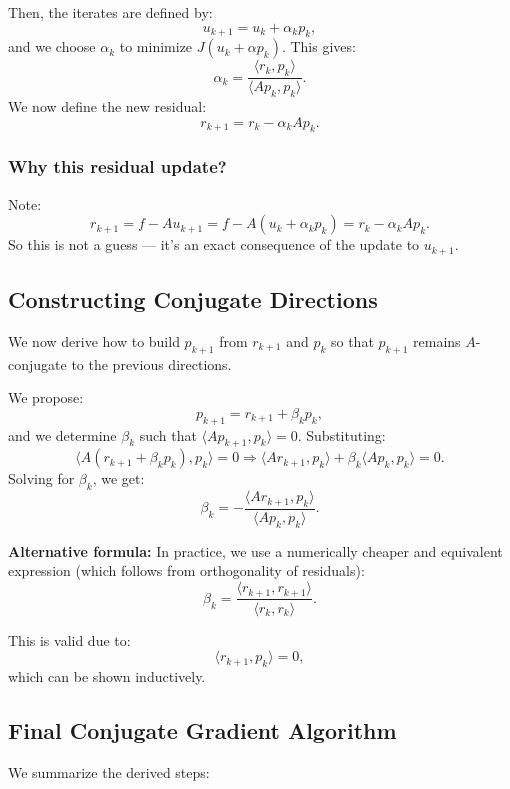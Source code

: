 \documentclass[12pt]{article}
\begin{document}
Then, the iterates are defined by:
\[
u_{k+1} = u_k + \alpha_k p_k,
\]
and we choose \( \alpha_k \) to minimize \( J(u_k + \alpha p_k) \). This gives:
\[
\alpha_k = \frac{\langle r_k, p_k \rangle}{\langle A p_k, p_k \rangle}.
\]
We now define the new residual:
\[
r_{k+1} = r_k - \alpha_k A p_k.
\]

\subsubsection*{Why this residual update?}

Note:
\[
r_{k+1} = f - A u_{k+1} = f - A(u_k + \alpha_k p_k) = r_k - \alpha_k A p_k.
\]
So this is not a guess — it's an exact consequence of the update to \( u_{k+1} \).

\subsection{Constructing Conjugate Directions}

We now derive how to build \( p_{k+1} \) from \( r_{k+1} \) and \( p_k \) so that \( p_{k+1} \) remains \( A \)-conjugate to the previous directions.

We propose:
\[
p_{k+1} = r_{k+1} + \beta_k p_k,
\]
and we determine \( \beta_k \) such that \( \langle A p_{k+1}, p_k \rangle = 0 \). Substituting:
\[
\langle A (r_{k+1} + \beta_k p_k), p_k \rangle = 0 \Rightarrow \langle A r_{k+1}, p_k \rangle + \beta_k \langle A p_k, p_k \rangle = 0.
\]
Solving for \( \beta_k \), we get:
\[
\beta_k = - \frac{\langle A r_{k+1}, p_k \rangle}{\langle A p_k, p_k \rangle}.
\]

\textbf{Alternative formula:} In practice, we use a numerically cheaper and equivalent expression (which follows from orthogonality of residuals):
\[
\beta_k = \frac{\langle r_{k+1}, r_{k+1} \rangle}{\langle r_k, r_k \rangle}.
\]

This is valid due to:
\[
\langle r_{k+1}, p_k \rangle = 0,
\]
which can be shown inductively.

\subsection{Final Conjugate Gradient Algorithm}

We summarize the derived steps:
\end{document}
